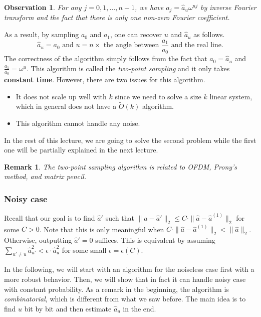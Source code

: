 \documentclass[11pt]{article}
\newtheorem{observation}[theorem]{Observation}
\newtheorem{remark}[theorem]{Remark}
\begin{document}
\begin{observation}
	For any $j=0,1,\dots,n-1$, we have $a_j=\hat{a}_u\omega^{uj}$ by inverse Fourier transform and the fact that there is only one non-zero Fourier coefficient.
\end{observation}

As a result, by sampling $a_0$ and $a_1$, one can recover $u$ and $\hat{a}_u$ as follows.
\begin{equation}
\hat{a}_u = a_0\text{ and }u=n\times\text{ the angle between $\frac{a_1}{a_0}$ and the real line}.
\end{equation}
The correctness of the algorithm simply follows from the fact that $a_0=\hat{a}_u$ and $\frac{a_1}{a_0}=\omega^{u}$. This algorithm is called the \textit{two-point sampling} and it only takes \textbf{constant time}. However, there are two issues for this algorithm.
\begin{itemize}
	\item It does not scale up well with $k$ since we need to solve a size $k$ linear system, which in general does not have a $\tilde{O}(k)$ algorithm.
	\item This algorithm cannot handle any noise.
\end{itemize}
In the rest of this lecture, we are going to solve the second problem while the first one will be partially explained in the next lecture.

\begin{remark}
	The two-point sampling algorithm is related to OFDM, Prony’s method, and matrix pencil.
\end{remark}

\subsubsection{Noisy case}
Recall that our goal is to find $\hat{a}'$ such that $\|\hat{a}-\hat{a}'\|_2\leq C\cdot\|\hat{a}-\hat{a}^{(1)}\|_2$ for some $C>0$. Note that this is only meaningful when $C\cdot\|\hat{a}-\hat{a}^{(1)}\|_2<\|\hat{a}\|_2$. Otherwise, outputting $\hat{a}'=0$ suffices. This is equivalent by assuming $\sum_{u'\neq u}\hat{a}_{u'}^2<\epsilon\cdot\hat{a}_u^2$ for some small $\epsilon=\epsilon(C)$.

In the following, we will start with an algorithm for the noiseless case first with a more robust behavior. Then, we will show that in fact it can handle noisy case with constant probability. As a remark in the beginning, the algorithm is \textit{combinatorial}, which is different from what we saw before. The main idea is to find $u$ bit by bit and then estimate $\hat{a}_u$ in the end.
\end{document}
